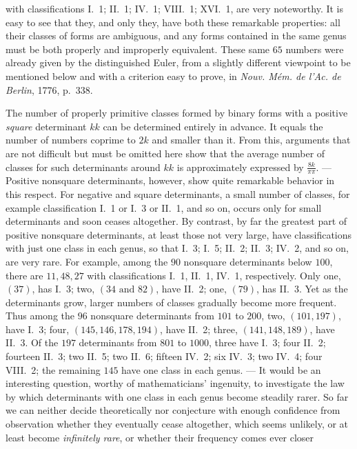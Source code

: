 with classifications I.~1; II.~1; IV.~1; VIII.~1; XVI.~1, are very noteworthy. It is easy to see that they, and only they, have both these remarkable properties: all their classes of forms are ambiguous, and any forms contained in the same genus must be both properly and improperly equivalent. These same \(65\) numbers were already given by the distinguished Euler, from a slightly different viewpoint to be mentioned below and with a criterion easy to prove, in \textit{Nouv. Mém. de l’Ac. de Berlin}, 1776, p.\ 338.

The number of properly primitive classes formed by binary forms with a positive \textit{square} determinant \(kk\) can be determined entirely in advance. It equals the number of numbers coprime to \(2k\) and smaller than it. From this, arguments that are not difficult but must be omitted here show that the average number of classes for such determinants around \(kk\) is approximately expressed by \(\frac{8k}{\pi\pi}\). — Positive nonsquare determinants, however, show quite remarkable behavior in this respect. For negative and square determinants, a small number of classes, for example classification I.~1 or I.~3 or II.~1, and so on, occurs only for small determinants and soon ceases altogether. By contrast, by far the greatest part of positive nonsquare determinants, at least those not very large, have classifications with just one class in each genus, so that I.~3; I.~5; II.~2; II.~3; IV.~2, and so on, are very rare. For example, among the \(90\) nonsquare determinants below \(100\), there are \(11,48,27\) with classifications I.~1, II.~1, IV.~1, respectively. Only one, \((37)\), has I.~3; two, \((34\text{ and }82)\), have II.~2; one, \((79)\), has II.~3. Yet as the determinants grow, larger numbers of classes gradually become more frequent. Thus among the \(96\) nonsquare determinants from \(101\) to \(200\), two, \((101,197)\), have I.~3; four, \((145,146,178,194)\), have II.~2; three, \((141,148,189)\), have II.~3. Of the \(197\) determinants from \(801\) to \(1000\), three have I.~3; four II.~2; fourteen II.~3; two II.~5; two II.~6; fifteen IV.~2; six IV.~3; two IV.~4; four VIII.~2; the remaining \(145\) have one class in each genus. — It would be an interesting question, worthy of mathematicians' ingenuity, to investigate the law by which determinants with one class in each genus become steadily rarer. So far we can neither decide theoretically nor conjecture with enough confidence from observation whether they eventually cease altogether, which seems unlikely, or at least become \textit{infinitely rare}, or whether their frequency comes ever closer
